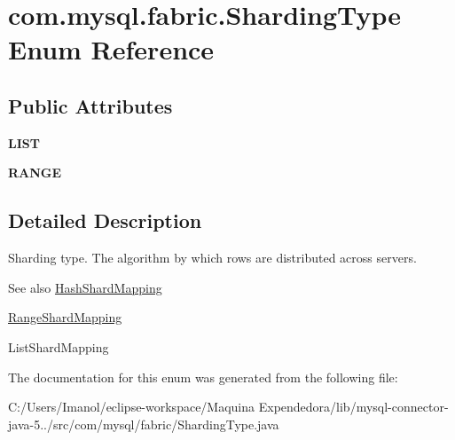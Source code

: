 \hypertarget{enumcom_1_1mysql_1_1fabric_1_1_sharding_type}{}\section{com.\+mysql.\+fabric.\+Sharding\+Type Enum Reference}
\label{enumcom_1_1mysql_1_1fabric_1_1_sharding_type}
\subsection*{Public Attributes}
\begin{DoxyCompactItemize}
\item 
\mbox{\label{enumcom_1_1mysql_1_1fabric_1_1_sharding_type_afdb5188a0630644050dfa6a665ce4101}} 
{\bfseries L\+I\+ST}
\item 
\mbox{\label{enumcom_1_1mysql_1_1fabric_1_1_sharding_type_a48aa3d16600c50aadf9f08ae26b8329a}} 
{\bfseries R\+A\+N\+GE}
\end{DoxyCompactItemize}


\subsection{Detailed Description}
Sharding type. The algorithm by which rows are distributed across servers.

\begin{DoxySeeAlso}{See also}
\mbox{\hyperlink{classcom_1_1mysql_1_1fabric_1_1_hash_shard_mapping}{Hash\+Shard\+Mapping}} 

\mbox{\hyperlink{classcom_1_1mysql_1_1fabric_1_1_range_shard_mapping}{Range\+Shard\+Mapping}} 

List\+Shard\+Mapping 
\end{DoxySeeAlso}


The documentation for this enum was generated from the following file\+:\begin{DoxyCompactItemize}
\item 
C\+:/\+Users/\+Imanol/eclipse-\/workspace/\+Maquina Expendedora/lib/mysql-\/connector-\/java-\/5../src/com/mysql/fabric/Sharding\+Type.\+java\end{DoxyCompactItemize}
